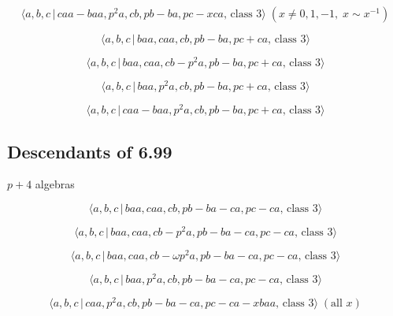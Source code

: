 \documentclass[10pt]{article}
\begin{document}
\begin{equation}
\langle a,b,c\,|\,caa-baa,p^{2}a,cb,pb-ba,pc-xca,\,\text{class }3\rangle
\;(x\neq 0,1,-1,\;x\sim x^{-1})  \tag{7.2939}
\end{equation}

\begin{equation}
\langle a,b,c\,|\,baa,caa,cb,pb-ba,pc+ca,\,\text{class }3\rangle 
\tag{7.2940}
\end{equation}

\begin{equation}
\langle a,b,c\,|\,baa,caa,cb-p^2a,pb-ba,pc+ca,\,\text{class }3\rangle 
\tag{7.2941}
\end{equation}

\begin{equation}
\langle a,b,c\,|\,baa,p^2a,cb,pb-ba,pc+ca,\,\text{class }3\rangle 
\tag{7.2942}
\end{equation}

\begin{equation}
\langle a,b,c\,|\,caa-baa,p^2a,cb,pb-ba,pc+ca,\,\text{class }3\rangle 
\tag{7.2943}
\end{equation}

\subsection{Descendants of 6.99}

$p+4$ algebras

\begin{equation}
\langle a,b,c\,|\,baa,caa,cb,pb-ba-ca,pc-ca,\,\text{class }3\rangle 
\tag{7.2944}
\end{equation}

\begin{equation}
\langle a,b,c\,|\,baa,caa,cb-p^2a,pb-ba-ca,pc-ca,\,\text{class }3\rangle 
\tag{7.2945}
\end{equation}

\begin{equation}
\langle a,b,c\,|\,baa,caa,cb-\omega p^{2}a,pb-ba-ca,pc-ca,\,\text{class }%
3\rangle  \tag{7.2946}
\end{equation}

\begin{equation}
\langle a,b,c\,|\,baa,p^2a,cb,pb-ba-ca,pc-ca,\,\text{class }3\rangle 
\tag{7.2947}
\end{equation}

\begin{equation}
\langle a,b,c\,|\,caa,p^2a,cb,pb-ba-ca,pc-ca-xbaa,\,\text{class }3\rangle \;(%
\text{all }x)  \tag{7.2948}
\end{equation}
\end{document}
